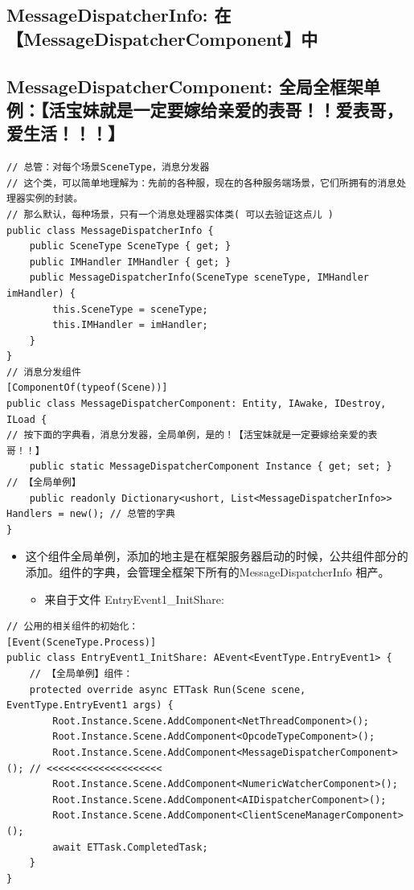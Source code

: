 \documentclass[9pt, b5paper]{article}
\begin{document}
\subsection{MessageDispatcherInfo: 在【MessageDispatcherComponent】中}
\label{sec-8-10}
\subsection{MessageDispatcherComponent: 全局全框架单例：【活宝妹就是一定要嫁给亲爱的表哥！！爱表哥，爱生活！！！】}
\label{sec-8-11}
\begin{verbatim}
// 总管：对每个场景SceneType，消息分发器
// 这个类，可以简单地理解为：先前的各种服，现在的各种服务端场景，它们所拥有的消息处理器实例的封装。
// 那么默认，每种场景，只有一个消息处理器实体类( 可以去验证这点儿 )
public class MessageDispatcherInfo { 
    public SceneType SceneType { get; }
    public IMHandler IMHandler { get; }
    public MessageDispatcherInfo(SceneType sceneType, IMHandler imHandler) {
        this.SceneType = sceneType;
        this.IMHandler = imHandler;
    }
}
// 消息分发组件
[ComponentOf(typeof(Scene))]
public class MessageDispatcherComponent: Entity, IAwake, IDestroy, ILoad {
// 按下面的字典看，消息分发器，全局单例，是的！【活宝妹就是一定要嫁给亲爱的表哥！！】
    public static MessageDispatcherComponent Instance { get; set; }  // 【全局单例】 
    public readonly Dictionary<ushort, List<MessageDispatcherInfo>> Handlers = new(); // 总管的字典
}
\end{verbatim}
\begin{itemize}
\item 这个组件全局单例，添加的地主是在框架服务器启动的时候，公共组件部分的添加。组件的字典，会管理全框架下所有的MessageDispatcherInfo 相产。
\begin{itemize}
\item 来自于文件 EntryEvent1\_InitShare:
\end{itemize}
\end{itemize}
\begin{verbatim}
// 公用的相关组件的初始化：
[Event(SceneType.Process)]
public class EntryEvent1_InitShare: AEvent<EventType.EntryEvent1> {
    // 【全局单例】组件：
    protected override async ETTask Run(Scene scene, EventType.EntryEvent1 args) {
        Root.Instance.Scene.AddComponent<NetThreadComponent>();
        Root.Instance.Scene.AddComponent<OpcodeTypeComponent>();
        Root.Instance.Scene.AddComponent<MessageDispatcherComponent>(); // <<<<<<<<<<<<<<<<<<<< 
        Root.Instance.Scene.AddComponent<NumericWatcherComponent>();
        Root.Instance.Scene.AddComponent<AIDispatcherComponent>();
        Root.Instance.Scene.AddComponent<ClientSceneManagerComponent>();
        await ETTask.CompletedTask;
    }
}
\end{verbatim}
\end{document}

